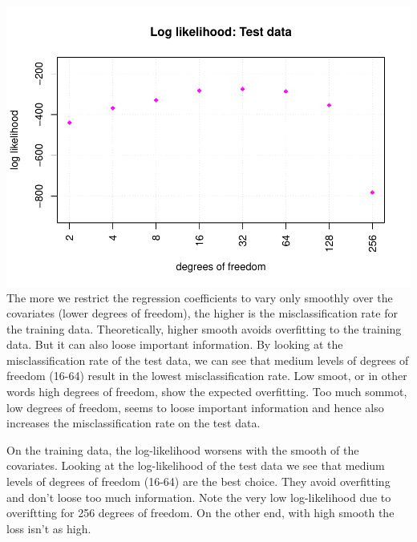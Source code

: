 \documentclass[
]{article}
\begin{document}
\includegraphics{A2_files/figure-latex/unnamed-chunk-24-4.pdf} The more
we restrict the regression coefficients to vary only smoothly over the
covariates (lower degrees of freedom), the higher is the
misclassification rate for the training data. Theoretically, higher
smooth avoids overfitting to the training data. But it can also loose
important information. By looking at the misclassification rate of the
test data, we can see that medium levels of degrees of freedom (16-64)
result in the lowest misclassification rate. Low smoot, or in other
words high degrees of freedom, show the expected overfitting. Too much
sommot, low degrees of freedom, seems to loose important information and
hence also increases the misclassification rate on the test data.

On the training data, the log-likelihood worsens with the smooth of the
covariates. Looking at the log-likelihood of the test data we see that
medium levels of degrees of freedom (16-64) are the best choice. They
avoid overfitting and don't loose too much information. Note the very
low log-likelihood due to overiftting for 256 degrees of freedom. On the
other end, with high smooth the loss isn't as high.
\end{document}
